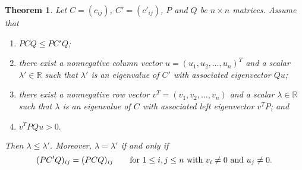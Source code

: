 \documentclass{article}
\theoremstyle{plain}
\newtheorem{thm}{Theorem}[subsection]
\theoremstyle{definition}
\begin{document}
\begin{thm}\label{pre_thm}
    Let $C=(c_{ij})$, $C'=(c'_{ij})$, $P$ and $Q$ be  $n\times n$ matrices.
Assume that
\begin{enumerate}[label=(\Roman*)]
    \item \label{pre_thm_em1}  $PCQ\leq PC'Q$;
    \item \label{pre_thm_em2} there exist a nonnegative column vector $u=(u_1, u_2, \ldots, u_n)^T$  and a
    scalar $\lambda'\in \mathbb{R}$ such that $\lambda'$ is an eigenvalue of $C'$ with
    associated eigenvector $Qu$;
    \item \label{pre_thm_em3} there exist a nonnegative row vector $v^T=(v_1, v_2, \ldots, v_n)$  and a scalar
    $\lambda\in \mathbb{R}$such that $\lambda$ is an eigenvalue of $C$ with associated  left
    eigenvector $v^TP$; and
    \item \label{pre_thm_em4}$v^TPQu>0.$
\end{enumerate}
    Then $\lambda\leq \lambda'$. Moreover, $\lambda=\lambda'$ if and only if
    \begin{equation}\label{pre0}
        (PC'Q)_{ij}=(PCQ)_{ij}\qquad \hbox{for~}1\leq i, j\leq n \hbox{~with~} v_i\ne 0 \hbox{~and~} u_j\ne 0.
    \end{equation}
\end{thm}
\end{document}
